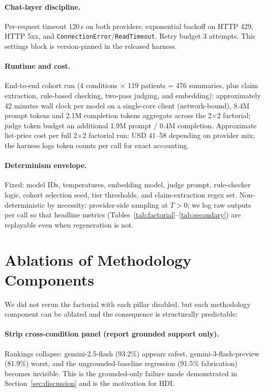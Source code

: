 \documentclass{article}
\theoremstyle{plain}
\begin{document}
\paragraph{Chat-layer discipline.} Per-request timeout 120\,s on both providers; exponential backoff on HTTP 429, HTTP 5xx, and \texttt{ConnectionError}/\texttt{ReadTimeout}. Retry budget 3 attempts. This settings block is version-pinned in the released harness.

\paragraph{Runtime and cost.} End-to-end cohort run (4 conditions $\times$ 119 patients = 476 summaries, plus claim extraction, rule-based checking, two-pass judging, and embedding): approximately 42 minutes wall clock per model on a single-core client (network-bound), 8.4M prompt tokens and 2.1M completion tokens aggregate across the 2$\times$2 factorial; judge token budget an additional 1.9M prompt / 0.4M completion. Approximate list-price cost per full 2$\times$2 factorial run: USD 41--58 depending on provider mix; the harness logs token counts per call for exact accounting.

\paragraph{Determinism envelope.} Fixed: model IDs, temperatures, embedding model, judge prompt, rule-checker logic, cohort selection seed, tier thresholds, and claim-extraction regex set. Non-deterministic by necessity: provider-side sampling at $T{>}0$; we log raw outputs per call so that headline metrics (Tables~\ref{tab:factorial}--\ref{tab:secondary}) are replayable even when regeneration is not.

\section{Ablations of Methodology Components}
\label{app:ablations}

We did not rerun the factorial with each pillar disabled, but each methodology component can be ablated and the consequence is structurally predictable:

\paragraph{Strip cross-condition panel (report grounded support only).} Rankings collapse: gemini-2.5-flash (93.2\%) appears safest, gemini-3-flash-preview (81.9\%) worst, and the ungrounded-baseline regression (91.5\% fabrication) becomes invisible. This is the grounded-only failure mode demonstrated in Section~\ref{sec:discussion} and is the motivation for HDI.
\end{document}
